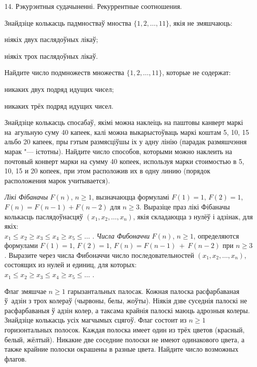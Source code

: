 \documentclass[12pt, a4paper]{article}
\begin{document}
\biLangHeader
{14. Рэкурэнтныя судачыненні.}
{Рекуррентные соотношения.}

\begin{problemList}

\problemItemSimple
{%
Знайдзіце колькасць падмностваў мноства $\{1, 2, \ldots, 11\}$, якія не змяшчаюць:
\begin{belarusianEnumerate}
    \item ніякіх двух паслядоўных лікаў;
    \item ніякіх трох паслядоўных лікаў.
\end{belarusianEnumerate}}
{%
Найдите число подмножеств множества $\{1, 2, \ldots, 11\}$, которые не содержат:
\begin{russianEnumerate}
    \item никаких двух подряд идущих чисел;
    \item никаких трёх подряд идущих чисел.
\end{russianEnumerate}}

\bigskip

\problemItemSimple
{Знайдзіце колькасць спосабаў, якімі можна наклеіць на паштовы канверт маркі на~агульную
суму 40 капеек, калі можна выкарыстоўваць маркі коштам 5, 10, 15 альбо 20 капеек,
пры гэтым размясціўшы іх у адну лінію (парадак размяшчэння марак "--- істотны).}
{Найдите число способов, которыми можно наклеить на почтовый конверт
марки на сумму 40 копеек, используя марки стоимостью в 5, 10, 15 и 20 копеек,
при этом расположив их в одну линию (порядок расположения марок учитывается).}

\bigskip

\problemItemSimple
{\emph{Лікі Фібаначы} $F(n)$, $n \ge 1$, вызначаюцца формуламі
$F(1) = 1$, $F(2) = 1$, $F(n) = F(n - 1) + F(n - 2)$ для $n \ge 3$.
Выразіце праз лікі Фібаначы колькасць паслядоўнасцяў $(x_1, x_2, \ldots, x_n)$,
якія складаюцца з нулёў і адзінак, для якіх: \\
$x_1 \le x_2 \ge x_3 \le x_4 \ge x_5 \le \ldots\,\,$.}
{\emph{Числа Фибоначчи} $F(n)$, $n \ge 1$, определяются формулами
$F(1) = 1$, $F(2) = 1$, $F(n) = F(n - 1)~+~F(n - 2)$ при $n \ge 3$. Выразите
через числа Фибоначчи число последовательностей $(x_1, x_2, \ldots, x_n)$,
состоящих из нулей и единиц, для которых: \\
$x_1 \le x_2 \ge x_3 \le x_4 \ge x_5 \le \ldots\,\,$.}

\bigskip

\problemItemSimple
{Флаг змяшчае $n \ge 1$ гарызантальных палосак. Кожная палоска расфарбаваная ў~адзін з трох колераў (чырвоны, белы, жоўты).
Ніякія дзве суседнія палоскі не расфарбаваныя ў адзін колер, а таксама крайнія палоскі маюць адрозныя колеры.
Знайдзіце колькасць усіх магчымых сцягоў.}
{Флаг состоит из $n \ge 1$ горизонтальных полосок. Каждая полоска
имеет один из трёх цветов (красный, белый, жёлтый). Никакие две соседние полоски
не имеют одинакового цвета, а также крайние полоски окрашены в разные цвета.
Найдите число возможных флагов.}


\end{problemList}
\end{document}
